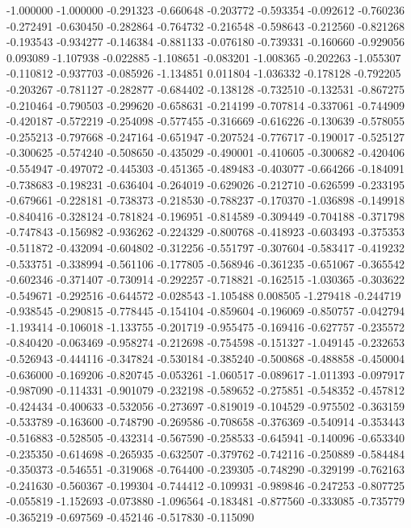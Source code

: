 -1.000000
-1.000000
-0.291323
-0.660648
-0.203772
-0.593354
-0.092612
-0.760236
-0.272491
-0.630450
-0.282864
-0.764732
-0.216548
-0.598643
-0.212560
-0.821268
-0.193543
-0.934277
-0.146384
-0.881133
-0.076180
-0.739331
-0.160660
-0.929056
0.093089
-1.107938
-0.022885
-1.108651
-0.083201
-1.008365
-0.202263
-1.055307
-0.110812
-0.937703
-0.085926
-1.134851
0.011804
-1.036332
-0.178128
-0.792205
-0.203267
-0.781127
-0.282877
-0.684402
-0.138128
-0.732510
-0.132531
-0.867275
-0.210464
-0.790503
-0.299620
-0.658631
-0.214199
-0.707814
-0.337061
-0.744909
-0.420187
-0.572219
-0.254098
-0.577455
-0.316669
-0.616226
-0.130639
-0.578055
-0.255213
-0.797668
-0.247164
-0.651947
-0.207524
-0.776717
-0.190017
-0.525127
-0.300625
-0.574240
-0.508650
-0.435029
-0.490001
-0.410605
-0.300682
-0.420406
-0.554947
-0.497072
-0.445303
-0.451365
-0.489483
-0.403077
-0.664266
-0.184091
-0.738683
-0.198231
-0.636404
-0.264019
-0.629026
-0.212710
-0.626599
-0.233195
-0.679661
-0.228181
-0.738373
-0.218530
-0.788237
-0.170370
-1.036898
-0.149918
-0.840416
-0.328124
-0.781824
-0.196951
-0.814589
-0.309449
-0.704188
-0.371798
-0.747843
-0.156982
-0.936262
-0.224329
-0.800768
-0.418923
-0.603493
-0.375353
-0.511872
-0.432094
-0.604802
-0.312256
-0.551797
-0.307604
-0.583417
-0.419232
-0.533751
-0.338994
-0.561106
-0.177805
-0.568946
-0.361235
-0.651067
-0.365542
-0.602346
-0.371407
-0.730914
-0.292257
-0.718821
-0.162515
-1.030365
-0.303622
-0.549671
-0.292516
-0.644572
-0.028543
-1.105488
0.008505
-1.279418
-0.244719
-0.938545
-0.290815
-0.778445
-0.154104
-0.859604
-0.196069
-0.850757
-0.042794
-1.193414
-0.106018
-1.133755
-0.201719
-0.955475
-0.169416
-0.627757
-0.235572
-0.840420
-0.063469
-0.958274
-0.212698
-0.754598
-0.151327
-1.049145
-0.232653
-0.526943
-0.444116
-0.347824
-0.530184
-0.385240
-0.500868
-0.488858
-0.450004
-0.636000
-0.169206
-0.820745
-0.053261
-1.060517
-0.089617
-1.011393
-0.097917
-0.987090
-0.114331
-0.901079
-0.232198
-0.589652
-0.275851
-0.548352
-0.457812
-0.424434
-0.400633
-0.532056
-0.273697
-0.819019
-0.104529
-0.975502
-0.363159
-0.533789
-0.163600
-0.748790
-0.269586
-0.708658
-0.376369
-0.540914
-0.353443
-0.516883
-0.528505
-0.432314
-0.567590
-0.258533
-0.645941
-0.140096
-0.653340
-0.235350
-0.614698
-0.265935
-0.632507
-0.379762
-0.742116
-0.250889
-0.584484
-0.350373
-0.546551
-0.319068
-0.764400
-0.239305
-0.748290
-0.329199
-0.762163
-0.241630
-0.560367
-0.199304
-0.744412
-0.109931
-0.989846
-0.247253
-0.807725
-0.055819
-1.152693
-0.073880
-1.096564
-0.183481
-0.877560
-0.333085
-0.735779
-0.365219
-0.697569
-0.452146
-0.517830
-0.115090
